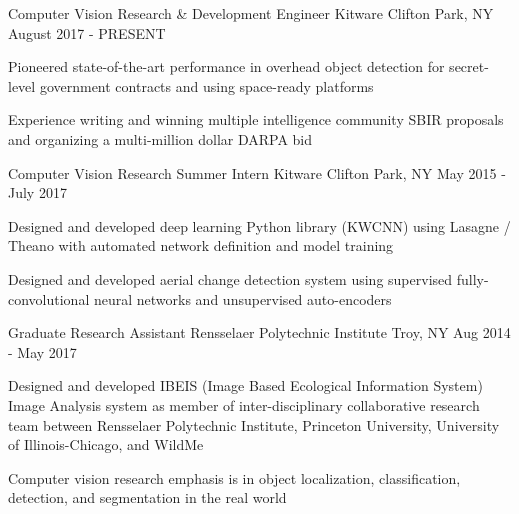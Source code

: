 

\begin{cventries}

  \cventry
    {Computer Vision Research \& Development Engineer} %
    {Kitware} %
    {Clifton Park, NY} %
    {August 2017 - PRESENT} %
    {
      \begin{cvitems} %
        \item {Pioneered state-of-the-art performance in overhead object detection for secret-level government contracts and using space-ready platforms}
        \item {Experience writing and winning multiple intelligence community SBIR proposals and organizing a multi-million dollar DARPA bid}
      \end{cvitems}
    }

  \cventry
    {Computer Vision Research Summer Intern} %
    {Kitware} %
    {Clifton Park, NY} %
    {May 2015 - July 2017} %
    {
      \begin{cvitems} %
        \item {Designed and developed deep learning Python library (KWCNN) using Lasagne / Theano with automated network definition and model training}
        \item {Designed and developed aerial change detection system using supervised fully-convolutional neural networks and unsupervised auto-encoders}
      \end{cvitems}
    }

\ifresume
\else
    \cventry
      {Graduate Research Assistant} %
      {Rensselaer Polytechnic Institute} %
      {Troy, NY} %
      {Aug 2014 - May 2017} %
      {
        \begin{cvitems} %
          \item {Designed and developed IBEIS (Image Based Ecological Information System) Image Analysis system as member of inter-disciplinary collaborative research team between Rensselaer Polytechnic Institute, Princeton University, University of Illinois-Chicago, and WildMe}
          \item {Computer vision research emphasis is in object localization, classification, detection, and segmentation in the real world}
        \end{cvitems}
      }
\fi


\end{cventries}
